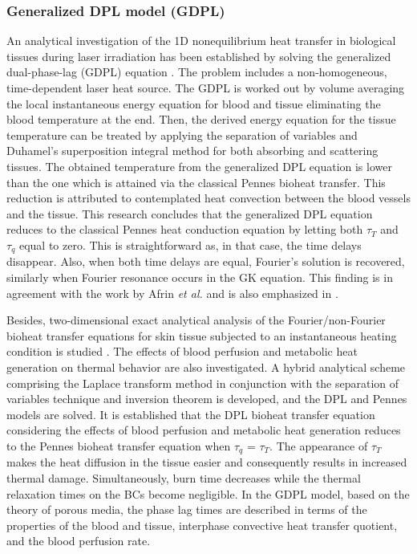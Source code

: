 \documentclass[sn-mathphys]{sn-jnl}%
\theoremstyle{thmstyleone}%
\theoremstyle{thmstyletwo}%
\theoremstyle{thmstylethree}%
\begin{document}
{%
\subsubsection{Generalized DPL model (GDPL)}
An analytical investigation of the 1D nonequilibrium heat transfer in biological tissues during laser irradiation has been established by solving the generalized dual-phase-lag (GDPL) equation \cite{Hooshmand20151}. The problem includes a non-homogeneous, time-dependent laser heat source. The GDPL is worked out by volume averaging the local instantaneous energy equation for blood and tissue { eliminating the blood temperature at the end. Then, the derived energy equation for the tissue temperature} can be treated by applying the separation of variables and Duhamel's superposition integral method for both absorbing and scattering tissues. The obtained temperature from the generalized DPL equation is lower than the one which is attained via the classical Pennes bioheat transfer. This reduction is attributed to contemplated heat convection between the blood vessels and the tissue. This research concludes that the generalized DPL equation reduces to the classical Pennes heat conduction equation by letting both $\tau_T$ and $\tau_q$ equal to zero. { This is straightforward as, in that case, the time delays disappear. Also, when both time delays are equal, Fourier's solution is recovered, similarly when Fourier resonance occurs in the GK equation.} This finding is in agreement with the work by Afrin \emph{et al.} \cite{Afrin2012} and is also emphasized in \cite{Ziaei2016}. 

Besides, two-dimensional exact analytical analysis of the Fourier/non-Fourier bioheat transfer equations for skin tissue subjected to an instantaneous heating condition is studied \cite{Askarizadeh2015}. The effects of blood perfusion and metabolic heat generation on thermal behavior are also investigated. A hybrid analytical scheme comprising the Laplace transform method in conjunction with the separation of variables technique and inversion theorem is developed, and the DPL and Pennes models are solved. It is established that the DPL bioheat transfer equation considering the effects of blood perfusion and metabolic heat generation reduces to the Pennes bioheat transfer equation when $\tau_q$ = $\tau_T$. The appearance of $\tau_T$ makes the heat diffusion in the tissue easier and consequently results in increased thermal damage. Simultaneously, burn time decreases while the thermal relaxation times on the BCs become negligible. In the GDPL model, based on the theory of porous media, the phase lag times are described in terms of the properties of the blood and tissue, interphase convective heat transfer quotient, and the blood perfusion rate.

}
\end{document}
